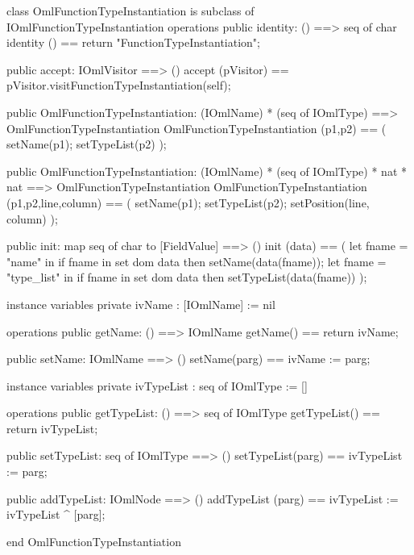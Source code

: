 \begin{vdm_al}
class OmlFunctionTypeInstantiation is subclass of IOmlFunctionTypeInstantiation
operations
  public identity: () ==> seq of char
  identity () == return "FunctionTypeInstantiation";

  public accept: IOmlVisitor ==> ()
  accept (pVisitor) == pVisitor.visitFunctionTypeInstantiation(self);

  public OmlFunctionTypeInstantiation:
    (IOmlName) *
    (seq of IOmlType) ==> OmlFunctionTypeInstantiation
  OmlFunctionTypeInstantiation (p1,p2) == 
    ( setName(p1);
      setTypeList(p2) );

  public OmlFunctionTypeInstantiation:
    (IOmlName) *
    (seq of IOmlType) *
    nat *
    nat ==> OmlFunctionTypeInstantiation
  OmlFunctionTypeInstantiation (p1,p2,line,column) == 
    ( setName(p1);
      setTypeList(p2);
      setPosition(line, column) );

  public init: map seq of char to [FieldValue] ==> ()
  init (data) ==
    ( let fname = "name" in
        if fname in set dom data
        then setName(data(fname));
      let fname = "type_list" in
        if fname in set dom data
        then setTypeList(data(fname)) );

instance variables
  private ivName : [IOmlName] := nil

operations
  public getName: () ==> IOmlName
  getName() == return ivName;

  public setName: IOmlName ==> ()
  setName(parg) == ivName := parg;

instance variables
  private ivTypeList : seq of IOmlType := []

operations
  public getTypeList: () ==> seq of IOmlType
  getTypeList() == return ivTypeList;

  public setTypeList: seq of IOmlType ==> ()
  setTypeList(parg) == ivTypeList := parg;

  public addTypeList: IOmlNode ==> ()
  addTypeList (parg) == ivTypeList := ivTypeList ^ [parg];

end OmlFunctionTypeInstantiation
\end{vdm_al}


